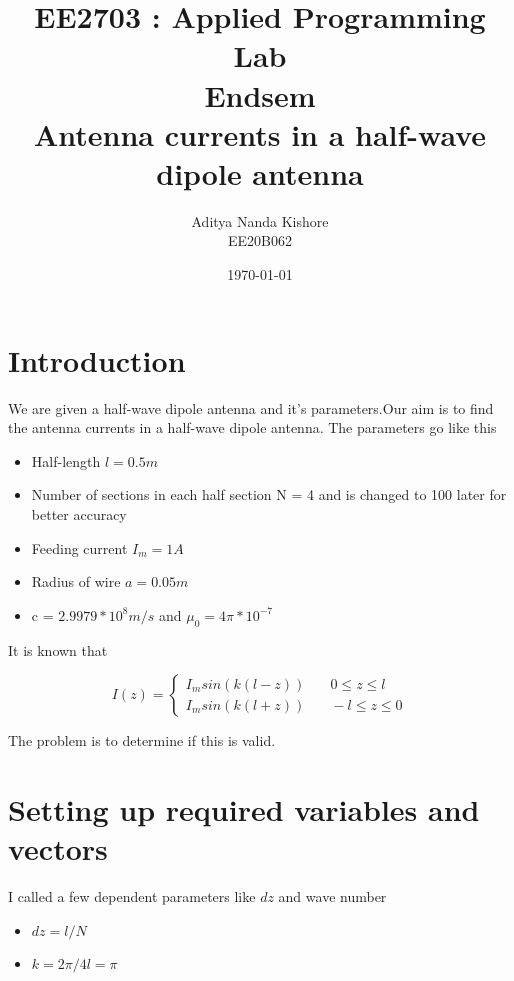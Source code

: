 \documentclass[12pt, a4paper]{report}
\title{\textbf{EE2703 : Applied Programming Lab \\ Endsem \\ Antenna currents in a half-wave dipole antenna}}
\author{Aditya Nanda Kishore\\ EE20B062}
\date{\today} %
\begin{document}
		
\maketitle
\section*{Introduction}
We are given a half-wave dipole antenna and it's parameters.Our aim is to find the antenna currents in a half-wave dipole antenna. The parameters go like this 

\begin{itemize}
	\item Half-length $l= 0.5 m$
	\item Number of sections in each half section N = 4 and is changed to 100 later for better accuracy
	\item Feeding current $I_m = 1 A$
	\item Radius of wire $a= 0.05 m$
	\item c = $2.9979 * 10^8 m/s$ and $\mu_0 = 4\pi*10^{-7}$ 
\end{itemize}

It is known that 

\begin{equation*}
I(z) =  \left\{
        \begin{array}{ll}
            I_msin(k(l-z)) & \quad 0 \leq z \leq l  \\
            I_msin(k(l+z))& \quad -l \leq z \leq 0
        \end{array}
    \right.
\end{equation*}

The problem is to determine if this is valid.


\section*{Setting up required variables and vectors}
I called a few dependent parameters like $dz$ and wave number
\begin{itemize}
	\item $dz = l/N$
	\item $k = 2\pi/4l = \pi$
\end{itemize}
\end{document}
